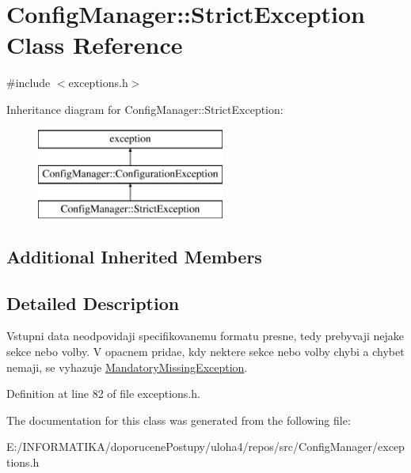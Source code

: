 \hypertarget{class_config_manager_1_1_strict_exception}{}\section{Config\+Manager\+:\+:Strict\+Exception Class Reference}
\label{class_config_manager_1_1_strict_exception}


{\ttfamily \#include $<$exceptions.\+h$>$}

Inheritance diagram for Config\+Manager\+:\+:Strict\+Exception\+:\begin{figure}[H]
\begin{center}
\leavevmode
\includegraphics[height=3.000000cm]{class_config_manager_1_1_strict_exception}
\end{center}
\end{figure}
\subsection*{Additional Inherited Members}


\subsection{Detailed Description}
Vstupni data neodpovidaji specifikovanemu formatu presne, tedy prebyvaji nejake sekce nebo volby. V opacnem pridae, kdy nektere sekce nebo volby chybi a chybet nemaji, se vyhazuje \hyperlink{class_config_manager_1_1_mandatory_missing_exception}{Mandatory\+Missing\+Exception}. 

Definition at line 82 of file exceptions.\+h.



The documentation for this class was generated from the following file\+:\begin{DoxyCompactItemize}
\item 
E\+:/\+I\+N\+F\+O\+R\+M\+A\+T\+I\+K\+A/doporucene\+Postupy/uloha4/repos/src/\+Config\+Manager/exceptions.\+h\end{DoxyCompactItemize}
